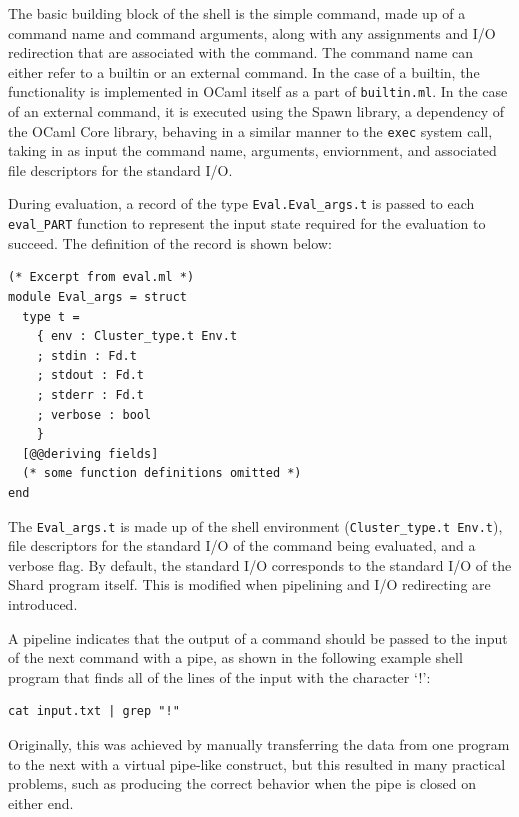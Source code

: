 \documentclass[twoside]{report}
\begin{document}

The basic building block of the shell is the simple command, made up of a command name and command arguments, along with any assignments and I/O redirection that are associated with the command.
The command name can either refer to a builtin or an external command.
In the case of a builtin, the functionality is implemented in OCaml itself as a part of \texttt{builtin.ml}.
In the case of an external command, it is executed using the Spawn library, a dependency of the OCaml Core library, behaving in a similar manner to the \texttt{exec} system call, taking in as input the command name, arguments, enviornment, and associated file descriptors for the standard I/O.

During evaluation, a record of the type \texttt{Eval.Eval\_args.t} is passed to each \texttt{eval\_PART} function to represent the input state required for the evaluation to succeed. The definition of the record is shown below:

\begin{lstlisting}
(* Excerpt from eval.ml *)
module Eval_args = struct
  type t =
    { env : Cluster_type.t Env.t
    ; stdin : Fd.t
    ; stdout : Fd.t
    ; stderr : Fd.t
    ; verbose : bool
    }
  [@@deriving fields]
  (* some function definitions omitted *)
end
\end{lstlisting}

The \texttt{Eval\_args.t} is made up of the shell environment (\texttt{Cluster\_type.t Env.t}), file descriptors for the standard I/O of the command being evaluated, and a verbose flag.
By default, the standard I/O corresponds to the standard I/O of the Shard program itself.
This is modified when pipelining and I/O redirecting are introduced.

A pipeline indicates that the output of a command should be passed to the input of the next command with a pipe, as shown in the following example shell program that finds all of the lines of the input with the character `!':
\begin{lstlisting}[language=shard]
cat input.txt | grep "!"
\end{lstlisting}
Originally, this was achieved by manually transferring the data from one program to the next with a virtual pipe-like construct, but this resulted in many practical problems, such as producing the correct behavior when the pipe is closed on either end.
\end{document}
